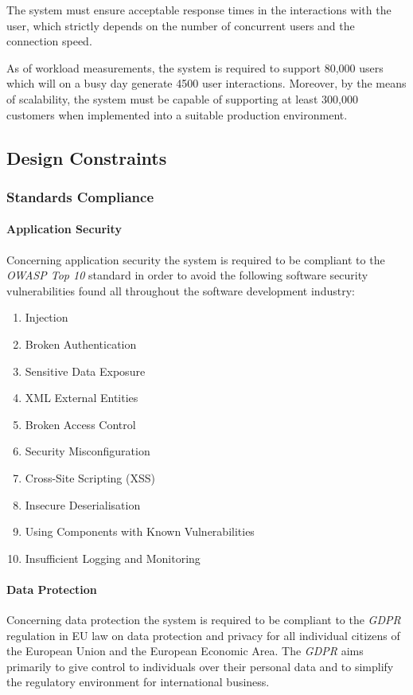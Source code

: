 The system must ensure acceptable response times in the interactions with the user, which strictly depends on the number of concurrent users and the connection speed.
	
As of workload measurements, the system is required to support 80,000 users which will on a busy day generate 4500 user interactions. Moreover, by the means of scalability, the system must be capable of supporting at least 300,000 customers when implemented into a suitable production environment.

\subsection{Design Constraints}

\subsubsection{Standards Compliance}

\paragraph{Application Security} Concerning application security the system is required to be compliant to the \emph{OWASP Top 10} standard in order to avoid the following software security vulnerabilities found all throughout the software development industry:

	\begin{enumerate}[label=\textbf{A\arabic*}]
		\item Injection
		\item Broken Authentication
		\item Sensitive Data Exposure
		\item XML External Entities
		\item Broken Access Control
		\item Security Misconfiguration
		\item Cross-Site Scripting (XSS)
		\item Insecure Deserialisation
		\item Using Components with Known Vulnerabilities
		\item Insufficient Logging and Monitoring
	\end{enumerate}

\paragraph{Data Protection} Concerning data protection the system is required to be compliant to the \emph{GDPR} regulation in EU law on data protection and privacy for all individual citizens of the European Union and the European Economic Area. The \emph{GDPR} aims primarily to give control to individuals over their personal data and to simplify the regulatory environment for international business.

